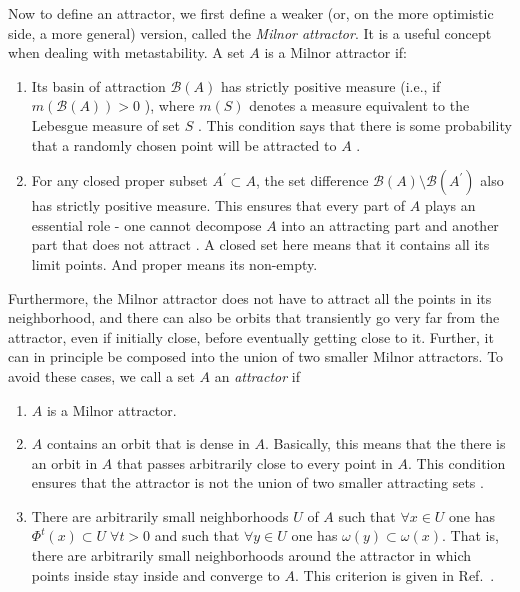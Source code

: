 Now to define an attractor, we first define a weaker (or, on the more optimistic side, a more general) version, called the \textit{Milnor attractor}. It is a useful concept when dealing with metastability. A set $A$ is a Milnor attractor if:
\begin{enumerate}
    \item Its basin of attraction $\mathcal{B}(A)$ has strictly positive measure (i.e., if $m(\mathcal{B}(A)) > 0$ ), where $m(S)$ denotes a measure equivalent to the Lebesgue measure of set $S$ \cite{milnor1985on}. This condition says that there is some probability that a randomly chosen point will be attracted to $A$ \cite{milnor1985on}.
    \item For any closed proper subset $A^\prime \subset A$, the set difference $\mathcal{B}(A) \setminus \mathcal{B}(A^\prime)$ also has strictly positive measure. This ensures that every part of $A$ plays an essential role - one cannot decompose $A$ into an attracting part and another part that does not attract \cite{milnor1985on, taylor2011attractors}. A closed set here means that it contains all its limit points. And proper means its non-empty.
\end{enumerate}

Furthermore, the Milnor attractor does not have to attract all the points in its neighborhood, and there can also be orbits that transiently go very far from the attractor, even if initially close, before eventually getting close to it. Further, it can in principle be composed into the union of two smaller Milnor attractors. To avoid these cases, we call a set $A$ an \textit{attractor} if
%
\begin{enumerate}
    \item $A$ is a Milnor attractor.
    \item $A$ contains an orbit that is dense in $A$. Basically, this means that the there is an orbit in $A$ that passes arbitrarily close to every point in $A$. This condition ensures that the attractor is not the union of two smaller attracting sets \cite{taylor2011attractors}. %
    \item There are arbitrarily small neighborhoods $U$ of $A$ such that $\forall x \in U$ one has $\Phi^t(x) \subset U  \; \forall t>0$ and such that $\forall y \in U$ one has $\omega(y) \subset \omega(x)$. That is, there are arbitrarily small neighborhoods around the attractor in which points inside stay inside and converge to $A$. This criterion is given in Ref.~\cite{broer2011dynamical}.
\end{enumerate}

